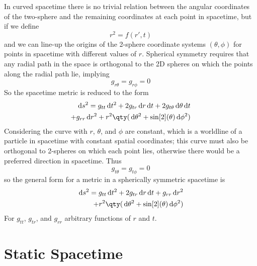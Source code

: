 In curved spacetime there is no trivial relation between the angular
coordinates of the two-sphere and the remaining coordinates at each
point in spacetime, but if we define
\begin{equation}
  \label{eq:118}
  r^2  = f(r', t)
\end{equation}
and we can line-up the origins of the 2-sphere coordinate systems
$(\theta, \phi)$ for points in spacetime with different values of
$r$. Spherical symmetry requires that any radial path in the space is
orthogonal to the 2D spheres on which the points along the radial path
lie, implying
\begin{equation}
  \label{eq:119}
  g_{r \theta} = g_{r \phi} = 0
\end{equation}
So the spacetime metric is reduced to the form
\begin{equation}
  \label{eq:120}
  \begin{split}
    \dd{s^2} = g_{tt} \dd{t^2} + 2 g_{tr} \dd{r}\dd{t} + 2 g_{t
      \theta} \dd{\theta}\dd{t} \\+ g_{rr} \dd{r^2} + r^2
    \qty(\dd{\theta^2} + \sin[2](\theta) \dd{\phi^2})
  \end{split}
\end{equation}
Considering the curve with $r$, $\theta$, and $\phi$ are constant,
which is a worldline of a particle in spacetime with constant spatial
coordinates; this curve must also be orthogonal to 2-spheres on which
each point lies, otherwise there would be a preferred direction in
spacetime. Thus
\begin{equation}
  \label{eq:121}
  g_{t\theta} = g_{t \phi} = 0
\end{equation}
so the general form for a metric in a spherically symmetric spacetime
is
\begin{equation}
  \label{eq:122}
  \begin{split}
    \dd{s^2} = g_{tt} \dd{t^2} + 2 g_{tr} \dd{r}\dd{t} + g_{rr}
    \dd{r^2} \\+ r^2 \qty( \dd{\theta^2} + \sin[2](\theta)
    \dd{\phi^2})
  \end{split}
\end{equation}
For $g_{tt}$, $g_{tr}$, and $g_{rr}$ arbitrary functions of $r$ and
$t$.

\section{Static Spacetime}
\label{sec:static-spacetime}

